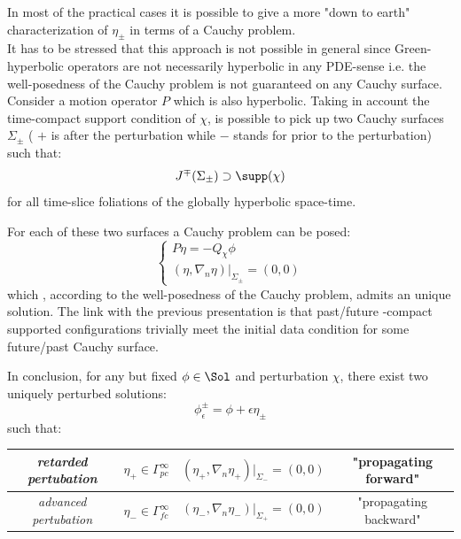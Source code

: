 \documentclass[Main]{subfiles}
\begin{document}
		
		\begin{observation}
			In most of the practical cases it is possible to give a more "down to earth" characterization of $\eta_\pm$ in terms of a Cauchy problem.\\
			It has to be stressed that this approach is not possible in general since Green-hyperbolic operators are not necessarily hyperbolic in any PDE-sense i.e. the well-posedness of the Cauchy problem is not guaranteed on any Cauchy surface. \cite[pag 1]{Bar} \cite[remark 3.18]{Bar2010}\cite[remark 2.1]{Khavkine2014}
			\\
		Consider a motion operator $P$ which is also hyperbolic.
		Taking in account the time-compact support condition of $\chi$, is possible to pick up  two Cauchy surfaces $\Sigma_\pm$ ( $+$ is after the perturbation while $-$ stands for prior to the perturbation) such that:
		\begin{displaymath}
			J^\mp (\Sigma_\pm) \supset \supp(\chi) 
		\end{displaymath}
		for all time-slice foliations of the globally hyperbolic space-time.

		For each of these two surfaces a Cauchy problem can be posed:
		\begin{equation}\label{PerturbationCauchyProblem}
		   \begin{cases}
			   P \eta = - Q_\chi \phi \\
			   (\eta, \nabla_n \eta ) \big \vert_{\Sigma_{\pm}} = (0,0)
   			\end{cases}
   		\end{equation}
   		which , according to the well-posedness of the Cauchy problem, admits an unique solution.
   		The link with the previous presentation is that past/future -compact supported configurations trivially meet the initial data condition for some future/past Cauchy surface.
		\end{observation}
		
		In conclusion, for any but fixed $\phi\in \Sol$ and perturbation $\chi$, there exist two uniquely perturbed solutions:
   		\begin{equation}\label{PerturbedSolution}
   			\phi^\pm_\epsilon = \phi + \epsilon \eta_\pm
   		\end{equation}
   		such that:
 		\begin{center}   \begin{tabular}{|c|c|c|c|}
   		\hline
  	 		\emph{retarded pertubation} & $\eta_+ \in \Gamma^\infty_{pc}$ & $(\eta_+, \nabla_n \eta_+ ) \big \vert_{\Sigma_{-}} = (0,0)$ & "propagating forward" \\
  	 		\hline
   			\emph{advanced pertubation} &$\eta_- \in \Gamma^\infty_{fc}$ & $(\eta_-, \nabla_n \eta_- ) \big \vert_{\Sigma_{+}} = (0,0)$ & "propagating backward" \\
   			\hline
   		\end{tabular}	\end{center} 	
		
\end{document}
